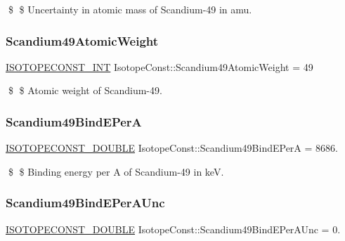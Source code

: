 \$ \$ Uncertainty in atomic mass of Scandium-\/49 in amu. \mbox{\label{group___isotope_const-_scandium-_sc49_ga8bf52f264a997aa47590ab16a2a3a164}} 
\subsubsection{\texorpdfstring{Scandium49\+Atomic\+Weight}{Scandium49AtomicWeight}}
{\footnotesize\ttfamily \mbox{\hyperlink{group___isotope_const-_macros_ga5f18360b3e99483a35c32d789e62621c}{I\+S\+O\+T\+O\+P\+E\+C\+O\+N\+S\+T\+\_\+\+I\+NT}} Isotope\+Const\+::\+Scandium49\+Atomic\+Weight = 49}

\$ \$ Atomic weight of Scandium-\/49. \mbox{\label{group___isotope_const-_scandium-_sc49_gacca85e9738717c0467cbf2c0bd38a7e6}} 
\subsubsection{\texorpdfstring{Scandium49\+Bind\+E\+PerA}{Scandium49BindEPerA}}
{\footnotesize\ttfamily \mbox{\hyperlink{group___isotope_const-_macros_ga8f45a7272ce02c0b4c65c44636ed719a}{I\+S\+O\+T\+O\+P\+E\+C\+O\+N\+S\+T\+\_\+\+D\+O\+U\+B\+LE}} Isotope\+Const\+::\+Scandium49\+Bind\+E\+PerA = 8686.}

\$ \$ Binding energy per A of Scandium-\/49 in keV. \mbox{\label{group___isotope_const-_scandium-_sc49_ga516ac73a8d90370b9e2b6f1ea7ab4f7e}} 
\subsubsection{\texorpdfstring{Scandium49\+Bind\+E\+Per\+A\+Unc}{Scandium49BindEPerAUnc}}
{\footnotesize\ttfamily \mbox{\hyperlink{group___isotope_const-_macros_ga8f45a7272ce02c0b4c65c44636ed719a}{I\+S\+O\+T\+O\+P\+E\+C\+O\+N\+S\+T\+\_\+\+D\+O\+U\+B\+LE}} Isotope\+Const\+::\+Scandium49\+Bind\+E\+Per\+A\+Unc = 0.}

